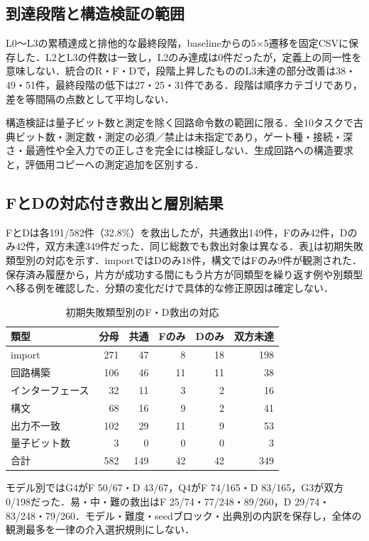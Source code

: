 \subsection{到達段階と構造検証の範囲}
L0〜L3の累積達成と排他的な最終段階，baselineからの5×5遷移を固定CSVに保存した．L2とL3の件数は一致し，L2のみ達成は0件だったが，定義上の同一性を意味しない．統合のR・F・Dで，段階上昇したもののL3未達の部分改善は38・49・51件，最終段階の低下は27・25・31件である．段階は順序カテゴリであり，差を等間隔の点数として平均しない．

構造検証は量子ビット数と測定を除く回路命令数の範囲に限る．全10タスクで古典ビット数・測定数・測定の必須／禁止は未指定であり，ゲート種・接続・深さ・最適性や全入力での正しさを完全には検証しない．生成回路への構造要求と，評価用コピーへの測定追加を区別する．

\subsection{FとDの対応付き救出と層別結果}
FとDは各191/582件（32.8\%）を救出したが，共通救出149件，Fのみ42件，Dのみ42件，双方未達349件だった．同じ総数でも救出対象は異なる．表\ref{tab:discordant}は初期失敗類型別の対応を示す．importではDのみ18件，構文ではFのみ9件が観測された．保存済み履歴から，片方が成功する間にもう片方が同類型を繰り返す例や別類型へ移る例を確認した．分類の変化だけで具体的な修正原因は確定しない．
\begin{table}[t]
\centering
\caption{初期失敗類型別のF・D救出の対応}
\label{tab:discordant}
\setlength{\tabcolsep}{3pt}
\setlength{\tabcolsep}{3pt}
\begin{tabular}{l|rrrrr}\hline
類型 & 分母 & 共通 & Fのみ & Dのみ & 双方未達 \\\hline
import & 271 & 47 & 8 & 18 & 198 \\
回路構築 & 106 & 46 & 11 & 11 & 38 \\
インターフェース & 32 & 11 & 3 & 2 & 16 \\
構文 & 68 & 16 & 9 & 2 & 41 \\
出力不一致 & 102 & 29 & 11 & 9 & 53 \\
量子ビット数 & 3 & 0 & 0 & 0 & 3 \\
\hline
合計 & 582 & 149 & 42 & 42 & 349 \\\hline
\end{tabular}
\end{table}
モデル別ではG4がF 50/67・D 43/67，Q4がF 74/165・D 83/165，G3が双方0/198だった．易・中・難の救出はF 25/74・77/248・89/260，D 29/74・83/248・79/260．モデル・難度・seedブロック・出典別の内訳を保存し，全体の観測最多を一律の介入選択規則にしない．

